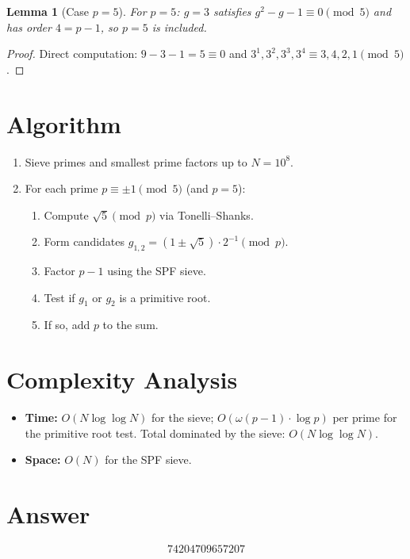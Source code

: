 \documentclass[11pt]{article}
\newtheorem{lemma}[theorem]{Lemma}
\begin{document}
\begin{lemma}[Case $p = 5$]
For $p = 5$: $g = 3$ satisfies $g^2 - g - 1 \equiv 0 \pmod{5}$ and has order $4 = p - 1$, so $p = 5$ is included.
\end{lemma}

\begin{proof}
Direct computation: $9 - 3 - 1 = 5 \equiv 0$ and $3^1, 3^2, 3^3, 3^4 \equiv 3, 4, 2, 1 \pmod{5}$.
\end{proof}

\section{Algorithm}
\begin{enumerate}
    \item Sieve primes and smallest prime factors up to $N = 10^8$.
    \item For each prime $p \equiv \pm 1 \pmod{5}$ (and $p = 5$):
    \begin{enumerate}
        \item Compute $\sqrt{5} \pmod{p}$ via Tonelli--Shanks.
        \item Form candidates $g_{1,2} = (1 \pm \sqrt{5}) \cdot 2^{-1} \pmod{p}$.
        \item Factor $p - 1$ using the SPF sieve.
        \item Test if $g_1$ or $g_2$ is a primitive root.
        \item If so, add $p$ to the sum.
    \end{enumerate}
\end{enumerate}

\section{Complexity Analysis}
\begin{itemize}
    \item \textbf{Time:} $O(N \log\log N)$ for the sieve; $O(\omega(p-1) \cdot \log p)$ per prime for the primitive root test. Total dominated by the sieve: $O(N \log\log N)$.
    \item \textbf{Space:} $O(N)$ for the SPF sieve.
\end{itemize}

\section{Answer}

\[
\boxed{74204709657207}
\]
\end{document}
